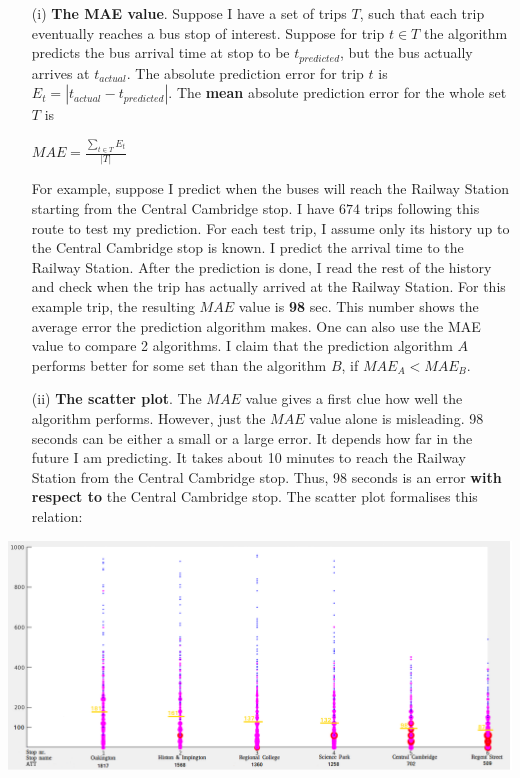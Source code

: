 \documentclass[12pt,a4paper,oneside,openright]{report}
\begin{document}
\begin{enumerate}
\item[(i)]
    \textbf{The MAE value}. Suppose I have a set
    of trips $T$, such that each trip eventually reaches a bus stop of interest. 
    Suppose for trip $t \in T$ the algorithm predicts the bus arrival time
    at stop to be $t_{predicted}$, but the bus actually arrives at $t_{actual}$.
    The absolute prediction error for trip $t$ is
    $E_t = |t_{actual} - t_{predicted}|$. The \textbf{mean} absolute prediction
    error for the whole set $T$ is

    \begin{center}
        $MAE = \frac{\sum\nolimits_{t \in {T}}{E_t}}{|T|}$
    \end{center}

    For example, suppose I predict when the buses will reach the Railway Station
    starting from the Central Cambridge stop. I have $674$ trips
    following this route to test my prediction. For each test trip, I assume
    only its history up to the Central Cambridge stop is known. I predict
    the arrival time to the Railway Station. After the prediction is done,
    I read the rest of the history and check when the trip has actually
    arrived at the Railway Station. For this example trip, the resulting
    $MAE$ value is \textbf{98} sec. This number shows the average error the
    prediction algorithm makes. One can also use the MAE value to compare
    2 algorithms. I claim that the prediction algorithm $A$ performs better
    for some set than the algorithm $B$, if $MAE_A < MAE_B$.

\item[(ii)] \textbf{The scatter plot}. The $MAE$ value gives a first
   clue how well the algorithm performs. However, just the $MAE$ value
   alone is misleading. 98 seconds can be either a small or a large
   error. It depends how far in the future I am predicting. It takes about 10 
   minutes to reach the Railway Station from the Central Cambridge stop. Thus,
   98 seconds is an error \textbf{with respect to} the Central Cambridge stop. 
   The scatter plot formalises this relation:


\end{enumerate}

\includegraphics[width=\textwidth]{figs/scatter_plot.png} \\
\end{document}
